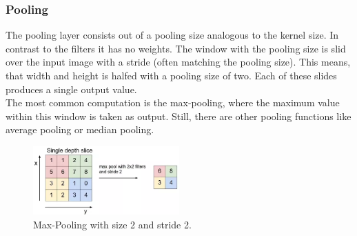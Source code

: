 \documentclass[
     11pt,         %
     a4paper,      %
     oneside,
     ]{article}
\begin{document}
\subsubsection{Pooling}
The pooling layer consists out of a pooling size analogous to the kernel size. In contrast to the filters it has no weights. The window with the pooling size is slid over the input image with a stride (often matching the pooling size). This means, that width and height is halfed with a pooling size of two. Each of these slides produces a single output value.\\
The most common computation is the max-pooling, where the maximum value within this window is taken as output. Still, there are other pooling functions like average pooling or median pooling.
\begin{figure}[H]
  \begin{center}
    \includegraphics[width=0.5\textwidth]{images/pooling.png}
    \caption{Max-Pooling with size 2 and stride 2.}
    \label{fig:pool}
  \end{center}
\end{figure}
\end{document}
